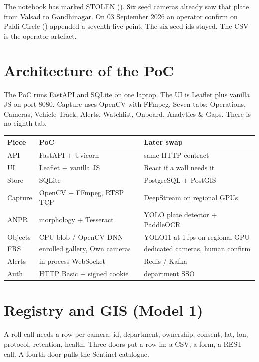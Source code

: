 \documentclass[listings]{csf301-notes}
\begin{document}
\begin{example}
The notebook has  marked STOLEN (). Six seed cameras already saw that plate from Valsad to Gandhinagar. On 03 September 2026 an operator confirm on Paldi Circle () appended a seventh live point. The six seed ids stayed. The CSV is the operator artefact.
\end{example}

\section{Architecture of the PoC}
\begin{center}\resizebox{0.98\textwidth}{!}{}\end{center}

The PoC runs FastAPI and SQLite on one laptop. The UI is Leaflet plus vanilla JS on port 8080. Capture uses OpenCV with FFmpeg. Seven tabs: Operations, Cameras, Vehicle Track, Alerts, Watchlist, Onboard, Analytics \& Gaps. There is no eighth tab.

\begin{langbox}
\begin{tabular}{@{}lll@{}}
\toprule
Piece & PoC & Later swap \\
\midrule
API & FastAPI + Uvicorn & same HTTP contract \\
UI & Leaflet + vanilla JS & React if a wall needs it \\
Store & SQLite & PostgreSQL + PostGIS \\
Capture & OpenCV + FFmpeg, RTSP TCP & DeepStream on regional GPUs \\
ANPR & morphology + Tesseract & YOLO plate detector + PaddleOCR \\
Objects & CPU blob / OpenCV DNN & YOLO11 at 1\,fps on regional GPU \\
FRS & enrolled gallery, Own cameras & dedicated cameras, human confirm \\
Alerts & in-process WebSocket & Redis / Kafka \\
Auth & HTTP Basic + signed cookie & department SSO \\
\bottomrule
\end{tabular}
\end{langbox}

\section{Registry and GIS (Model 1)}
A roll call needs a row per camera: id, department, ownership, consent, lat, lon, protocol, retention, health. Three doors put a row in: a CSV, a form, a REST call. A fourth door pulls the Sentinel catalogue.
\end{document}
